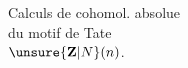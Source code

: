 
\begin{center}
Calculs de cohomol. absolue\\
du motif de Tate\\
$\unsure{\mathbf Z|N}(n)$.
\end{center}

